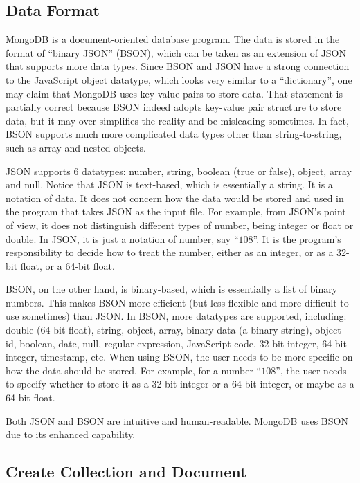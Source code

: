 \subsection{Data Format}

MongoDB is a document-oriented database program. The data is stored in the format of ``binary JSON'' (BSON), which can be taken as an extension of JSON that supports more data types. Since BSON and JSON have a strong connection to the JavaScript object datatype, which looks very similar to a ``dictionary'', one may claim that MongoDB uses key-value pairs to store data. That statement is partially correct because BSON indeed adopts key-value pair structure to store data, but it may over simplifies the reality and be misleading sometimes. In fact, BSON supports much more complicated data types other than string-to-string, such as array and nested objects.

JSON supports 6 datatypes: number, string, boolean (true or false), object, array and null. Notice that JSON is text-based, which is essentially a string. It is a notation of data. It does not concern how the data would be stored and used in the program that takes JSON as the input file. For example, from JSON's point of view, it does not distinguish different types of number, being integer or float or double. In JSON, it is just a notation of number, say ``$108$''. It is the program's responsibility to decide how to treat the number, either as an integer, or as a 32-bit float, or a 64-bit float.

BSON, on the other hand, is binary-based, which is essentially a list of binary numbers. This makes BSON more efficient (but less flexible and more difficult to use sometimes) than JSON. In BSON, more datatypes are supported, including: double (64-bit float), string, object, array, binary data (a binary string), object id, boolean, date, null, regular expression, JavaScript code, 32-bit integer, 64-bit integer, timestamp, etc. When using BSON, the user needs to be more specific on how the data should be stored. For example, for a number ``$108$'', the user needs to specify whether to store it as a 32-bit integer or a 64-bit integer, or maybe as a 64-bit float.

Both JSON and BSON are intuitive and human-readable. MongoDB uses BSON due to its enhanced capability.

\subsection{Create Collection and Document}

